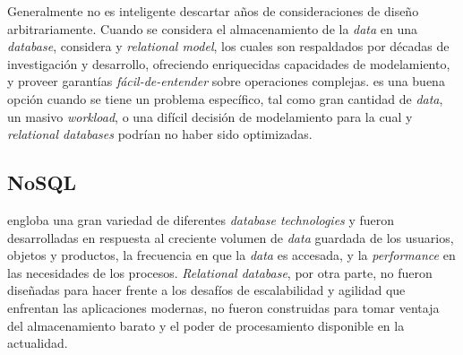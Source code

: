 Generalmente no es inteligente descartar años de consideraciones de diseño arbitrariamente. Cuando se considera el almacenamiento de la \textit{data} en una \textit{database}, considera  y \textit{relational model}, los cuales son respaldados por décadas  de investigación y desarrollo, ofreciendo enriquecidas capacidades de modelamiento, y proveer garantías \textit{fácil-de-entender} sobre operaciones complejas.  es una buena opción cuando se tiene un problema específico, tal como gran cantidad de \textit{data}, un masivo \textit{workload}, o una difícil decisión de modelamiento para la cual  y \textit{relational databases} podrían no haber sido optimizadas.

\subsection{NoSQL}

 engloba una gran variedad de diferentes \textit{database technologies} y fueron desarrolladas en respuesta al creciente volumen de \textit{data} guardada de los usuarios, objetos y productos, la frecuencia en que la \textit{data} es accesada, y la \textit{performance} en las necesidades de los procesos. \textit{Relational database}, por otra parte, no fueron diseñadas para hacer frente a los desafíos de escalabilidad y agilidad que enfrentan las aplicaciones modernas, no fueron construidas para tomar ventaja del almacenamiento barato y el poder de procesamiento disponible en la actualidad.

